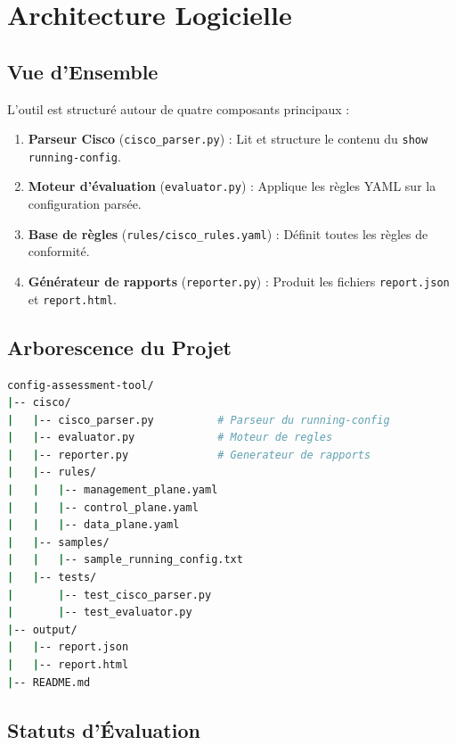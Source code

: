 \documentclass[12pt, a4paper]{report}
\begin{document}
\chapter{Architecture Logicielle}

\section{Vue d'Ensemble}

L'outil est structuré autour de quatre composants principaux :

\begin{enumerate}[leftmargin=1.5cm]
  \item \textbf{Parseur Cisco} (\texttt{cisco\_parser.py}) : Lit et structure le contenu du \texttt{show running-config}.
  \item \textbf{Moteur d'évaluation} (\texttt{evaluator.py}) : Applique les règles YAML sur la configuration parsée.
  \item \textbf{Base de règles} (\texttt{rules/cisco\_rules.yaml}) : Définit toutes les règles de conformité.
  \item \textbf{Générateur de rapports} (\texttt{reporter.py}) : Produit les fichiers \texttt{report.json} et \texttt{report.html}.
\end{enumerate}

\section{Arborescence du Projet}

\begin{lstlisting}[language=bash, caption={Structure des fichiers du module Cisco}]
config-assessment-tool/
|-- cisco/
|   |-- cisco_parser.py          # Parseur du running-config
|   |-- evaluator.py             # Moteur de regles
|   |-- reporter.py              # Generateur de rapports
|   |-- rules/
|   |   |-- management_plane.yaml
|   |   |-- control_plane.yaml
|   |   |-- data_plane.yaml
|   |-- samples/
|   |   |-- sample_running_config.txt
|   |-- tests/
|       |-- test_cisco_parser.py
|       |-- test_evaluator.py
|-- output/
|   |-- report.json
|   |-- report.html
|-- README.md
\end{lstlisting}

\section{Statuts d'Évaluation}
\end{document}
